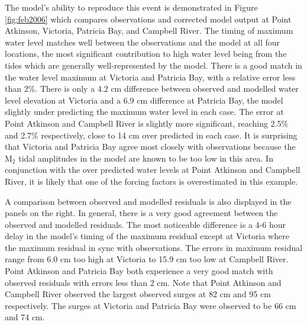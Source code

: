 \documentclass[pdftex,10pt]{article}
\begin{document}
The model's ability to reproduce this event is demonstrated in Figure \ref{fig:feb2006} which compares observations and corrected model output at Point Atkinson, Victoria, Patricia Bay, and Campbell River. The timing of maximum water level matches well between the observations and the model at all four locations, the most significant contribution to high water level being from the tides which are generally well-represented by the model. There is a good match in the water level maximum at Victoria and Patricia Bay, with a relative error less than 2\%. There is only a 4.2 cm difference between observed and modelled water level elevation at Victoria and a 6.9 cm difference at Patricia Bay, the model slightly under predicting the maximum water level in each case. The error at Point Atkinson and Campbell River is slightly more significant, reaching 2.5\% and 2.7\% respectively, close to 14 cm over predicted in each case. It is surprising that Victoria and Patricia Bay agree most closely with observations because the M$_2$ tidal amplitudes in the model are known to be too low in this area. In conjunction with the over predicted water levels at Point Atkinson and Campbell River, it is likely that one of the forcing factors is overestimated in this example. 

A comparison between observed and modelled residuals is also displayed in the panels on the right. In general, there is a very good agreement between the observed and modelled residuals. The most noticeable difference is a 4-6 hour delay in the model's timing of the maximum residual except at Victoria where the maximum residual in sync with observations. The errors in maximum residual range from 6.0 cm too high at Victoria to 15.9 cm too low at Campbell River. Point Atkinson and Patricia Bay both experience a very good match with observed residuals with errors less than 2 cm. Note that Point Atkinson and Campbell River observed the largest observed surges at 82 cm and 95 cm respectively. The surges at Victoria and Patricia Bay were observed to be 66 cm and 74 cm. 
\end{document}
